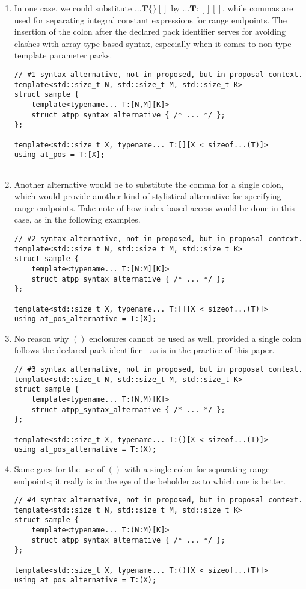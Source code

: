\begin{enumerate}
\item In one case, we could substitute $\bm{...T\{\}[]}$ by $\bm{...T:[][]}$, while commas are used for separating integral constant expressions for range endpoints.
The insertion of the colon after the declared pack identifier serves for avoiding clashes with array type based syntax, especially when it comes to non-type template parameter packs.
\begin{verbatim}
// #1 syntax alternative, not in proposed, but in proposal context.
template<std::size_t N, std::size_t M, std::size_t K>
struct sample {
    template<typename... T:[N,M][K]>
    struct atpp_syntax_alternative { /* ... */ };
};

template<std::size_t X, typename... T:[][X < sizeof...(T)]>
using at_pos = T:[X];
    
\end{verbatim}
\item Another alternative would be to substitute the comma for a single colon, which would provide another kind of stylistical alternative for specifying range endpoints.
Take note of how index based access would be done in this case, as in the following examples.
\begin{verbatim}
// #2 syntax alternative, not in proposed, but in proposal context.
template<std::size_t N, std::size_t M, std::size_t K>
struct sample {
    template<typename... T:[N:M][K]>
    struct atpp_syntax_alternative { /* ... */ };
};

template<std::size_t X, typename... T:[][X < sizeof...(T)]>
using at_pos_alternative = T:[X];
\end{verbatim}

\item No reason why $()$ enclosures cannot be used as well, provided a single colon follows the declared pack identifier - as is in the practice of this paper.
\begin{verbatim}
// #3 syntax alternative, not in proposed, but in proposal context.
template<std::size_t N, std::size_t M, std::size_t K>
struct sample {
    template<typename... T:(N,M)[K]>
    struct atpp_syntax_alternative { /* ... */ };
};

template<std::size_t X, typename... T:()[X < sizeof...(T)]>
using at_pos_alternative = T:(X);
\end{verbatim}

\item Same goes for the use of $()$ with a single colon for separating range endpoints; it really is in the eye of the beholder as to which one is better.
\begin{verbatim}
// #4 syntax alternative, not in proposed, but in proposal context.
template<std::size_t N, std::size_t M, std::size_t K>
struct sample {
    template<typename... T:(N:M)[K]>
    struct atpp_syntax_alternative { /* ... */ };
};

template<std::size_t X, typename... T:()[X < sizeof...(T)]>
using at_pos_alternative = T:(X);
\end{verbatim}
\end{enumerate}

